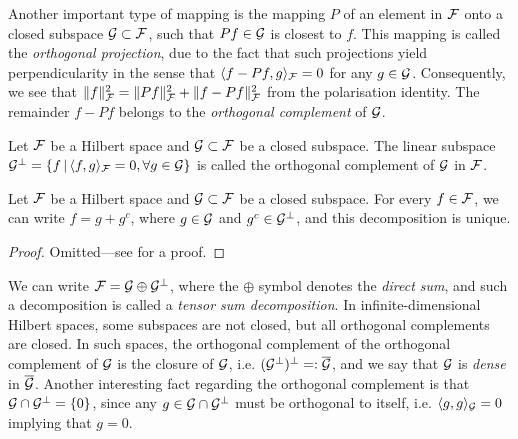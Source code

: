Another important type of mapping is the mapping $P$ of an element in ${\mathcal F}$ onto a closed subspace ${\mathcal G}\subset{\mathcal F}$, such that $Pf \in {\mathcal G}$ is closest to $f$.
This mapping is called the \emph{orthogonal projection}, due to the fact that such projections yield perpendicularity in the sense that $\langle f-Pf,g\rangle_{\mathcal F} = 0$ for any $g\in{\mathcal G}$.
Consequently, we see that $\lVert f\rVert_{\mathcal F}^2 = \lVert Pf\rVert_{\mathcal F}^2 + \lVert f-Pf\rVert_{\mathcal F}^2$ from the polarisation identity.
The remainder $f - Pf$ belongs to the \emph{orthogonal complement} of ${\mathcal G}$.

\begin{definition}
  Let ${\mathcal F}$ be a Hilbert space and ${\mathcal G} \subset {\mathcal F}$ be a closed subspace.
  The linear subspace ${\mathcal G}^\bot = \{ f \,|\, \langle f,g\rangle_{\mathcal F} = 0, \forall g \in {\mathcal G} \}$ is called the orthogonal complement of ${\mathcal G}$ in ${\mathcal F}$.
\end{definition}

\begin{theorem}\label{thm:orthdecomp}
  Let ${\mathcal F}$ be a Hilbert space and ${\mathcal G} \subset {\mathcal F}$ be a closed subspace.
  For every $f \in {\mathcal F}$, we can write $f = g + g^c$, where $g \in {\mathcal G}$ and $g^c \in {\mathcal G}^\bot$, and this decomposition is unique.
\end{theorem}

\begin{proof}
  Omitted---see \citet[Thm. 4.11]{rudin1987real} for a proof.
\end{proof}

We can write ${\mathcal F} = {\mathcal G} \oplus {\mathcal G}^\bot$, where the $\oplus$ symbol denotes the \emph{direct sum}, and such a decomposition is called a \emph{tensor sum decomposition}.
In infinite-dimensional Hilbert spaces, some subspaces are not closed, but all orthogonal complements are closed. 
In such spaces, the orthogonal complement of the orthogonal complement of ${\mathcal G}$ is the closure of ${\mathcal G}$, i.e. $({\mathcal G}^\bot)^\bot =: \overline {{\mathcal G}}$, and we say that ${\mathcal G}$ is \emph{dense} in $\overline {{\mathcal G}}$.
Another interesting fact regarding the orthogonal complement is that ${\mathcal G} \cap {\mathcal G}^\bot = \{ 0 \}$, since any $g\in {\mathcal G} \cap {\mathcal G}^\bot$ must be orthogonal to itself, i.e. $\langle g,g\rangle_{\mathcal G} = 0$ implying that $g=0$.

